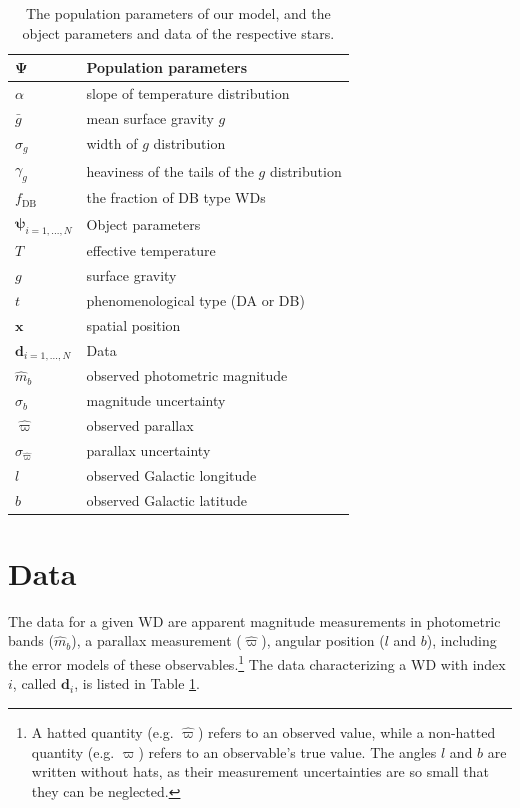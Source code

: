 \documentclass[fleqn,usenatbib]{mnras}
\newcommand{\popp}{\boldsymbol{\Psi}}
\newcommand{\objp}{\boldsymbol{\psi}}
\newcommand{\data}{\mathbf{d}}
\newcommand{\Teff}{T}
\newcommand{\logg}{g}
\begin{document}
\begin{table}
	\centering
	\caption{The population parameters of our model, and the object parameters and data of the respective stars.}
	\label{tab:parameters}
    \begin{tabular}{l l}
		\hline
		$\popp$  & Population parameters \\
		\hline
		$\alpha$ & slope of temperature distribution \\
		$\bar{g}$ & mean surface gravity $\logg$ \\
		$\sigma_g$ & width of $\logg$ distribution \\
		$\gamma_g$ & heaviness of the tails of the $\logg$ distribution \\
		$f_\text{DB}$ & the fraction of DB type WDs \\
        \hline
        $\objp_{i=1,...,N}$  & Object parameters \\
        \hline
        $\Teff$ & effective temperature \\
        $\logg$ & surface gravity \\
        $t$ & phenomenological type (DA or DB) \\
        $\mathbf{x}$ & spatial position  \\
        \hline
        $\data_{i=1,...,N}$ & Data \\
        \hline
        $\hat{m}_b$ & observed photometric magnitude \\
        $\sigma_b$ & magnitude uncertainty \\
        $\hat{\varpi}$ & observed parallax \\
        $\sigma_{\hat{\varpi}}$ & parallax uncertainty \\
        $l$ & observed Galactic longitude \\
        $b$ & observed Galactic latitude \\
		\hline
	\end{tabular}
\end{table}




\section{Data}\label{sec:data}

The data for a given WD are apparent magnitude measurements in photometric bands ($\hat{m}_b$), a parallax measurement ($\hat{\varpi}$), angular position ($l$ and $b$), including the error models of these observables.\footnote{A hatted quantity (e.g. $\hat{\varpi}$) refers to an observed value, while a non-hatted quantity (e.g. $\varpi$) refers to an observable's true value. The angles $l$ and $b$ are written without hats, as their measurement uncertainties are so small that they can be neglected.} The data characterizing a WD with index $i$, called $\data_i$, is listed in Table \ref{tab:parameters}.
\end{document}
